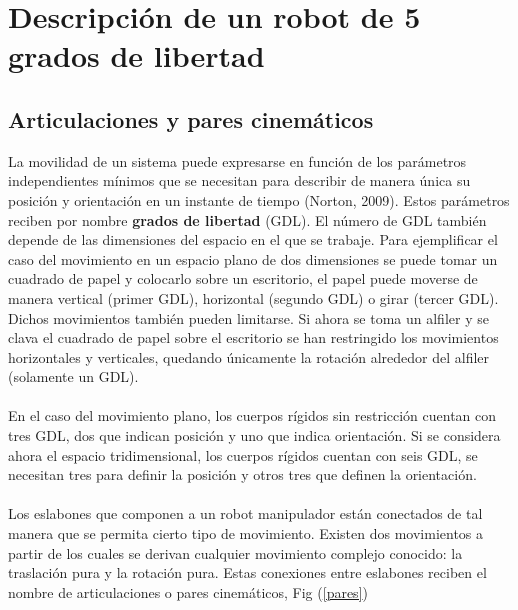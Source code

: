 

\chapter{\textcolor{Azul}{Descripción de un robot de 5 grados de libertad}}

\section{Articulaciones y pares cinemáticos}

La movilidad de un sistema puede expresarse en función de los parámetros independientes mínimos que se necesitan para describir de manera única su posición y orientación en un instante de tiempo (Norton, 2009). Estos parámetros reciben por nombre \textbf{grados de libertad} (GDL). El número de GDL también depende de las dimensiones del espacio en el que se trabaje. Para ejemplificar el caso del movimiento en un espacio plano de dos dimensiones se puede tomar un cuadrado de papel y colocarlo sobre un escritorio, el papel puede moverse de manera vertical (primer GDL), horizontal (segundo GDL) o girar (tercer GDL). Dichos movimientos también pueden limitarse. Si ahora se toma un alfiler y se clava el cuadrado de papel sobre el escritorio se han restringido los movimientos horizontales y verticales, quedando únicamente la rotación alrededor del alfiler (solamente un GDL).\\\\En el caso del movimiento plano, los cuerpos rígidos sin restricción cuentan con tres GDL, dos que indican posición y uno que indica orientación. Si se considera ahora el espacio tridimensional, los cuerpos rígidos cuentan con seis GDL, se necesitan tres para definir la posición y otros tres que definen la orientación. \\

\\Los eslabones que componen a un robot manipulador están conectados de tal manera que se permita cierto tipo de movimiento. Existen dos movimientos a partir de los cuales se derivan cualquier movimiento complejo conocido: la traslación pura y la rotación pura. Estas conexiones entre eslabones reciben el nombre de articulaciones o pares cinemáticos, Fig (\ref{pares})


